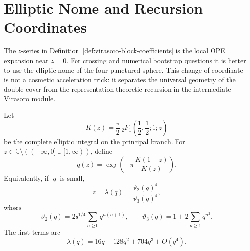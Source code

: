 \section{Elliptic Nome and Recursion Coordinates}
\label{sec:liouville-elliptic-recursion-coordinate}

The \(z\)-series in Definition~\ref{def:virasoro-block-coefficients} is the
local OPE expansion near \(z=0\).  For crossing and numerical bootstrap
questions it is better to use the elliptic nome of the four-punctured sphere.
This change of coordinate is not a cosmetic acceleration trick: it separates
the universal geometry of the double cover from the representation-theoretic
recursion in the intermediate Virasoro module.

\begin{definition}
\label{def:liouville-elliptic-nome}
Let
\[
  K(z)=\frac{\pi}{2}\,
  {}_2F_1\!\left(\frac12,\frac12;1;z\right)
\]
be the complete elliptic integral on the principal branch.  For
\(z\in\mathbb C\setminus((-\infty,0]\cup[1,\infty))\), define
\begin{equation}
  q(z)=\exp\!\left(-\pi\,\frac{K(1-z)}{K(z)}\right).
  \label{eq:liouville-elliptic-nome}
\end{equation}
Equivalently, if \(|q|\) is small,
\begin{equation}
  z=\lambda(q)
  =
  \frac{\vartheta_2(q)^4}{\vartheta_3(q)^4},
  \label{eq:liouville-modular-lambda}
\end{equation}
where
\[
  \vartheta_2(q)=2q^{1/4}\sum_{n\ge0}q^{n(n+1)},
  \qquad
  \vartheta_3(q)=1+2\sum_{n\ge1}q^{n^2}.
\]
The first terms are
\begin{equation}
  \lambda(q)=16q-128q^2+704q^3+O(q^4).
  \label{eq:liouville-lambda-q-expansion}
\end{equation}
\end{definition}

